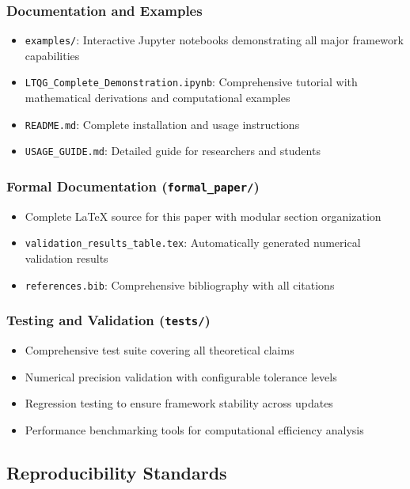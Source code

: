 \subsubsection{Documentation and Examples}

\begin{itemize}
\item \texttt{examples/}: Interactive Jupyter notebooks demonstrating all major framework capabilities
\item \texttt{LTQG\_Complete\_Demonstration.ipynb}: Comprehensive tutorial with mathematical derivations and computational examples
\item \texttt{README.md}: Complete installation and usage instructions
\item \texttt{USAGE\_GUIDE.md}: Detailed guide for researchers and students
\end{itemize}

\subsubsection{Formal Documentation (\texttt{formal\_paper/})}

\begin{itemize}
\item Complete LaTeX source for this paper with modular section organization
\item \texttt{validation\_results\_table.tex}: Automatically generated numerical validation results
\item \texttt{references.bib}: Comprehensive bibliography with all citations
\end{itemize}

\subsubsection{Testing and Validation (\texttt{tests/})}

\begin{itemize}
\item Comprehensive test suite covering all theoretical claims
\item Numerical precision validation with configurable tolerance levels
\item Regression testing to ensure framework stability across updates
\item Performance benchmarking tools for computational efficiency analysis
\end{itemize}

\subsection{Reproducibility Standards}
\label{subsec:reproducibility}

